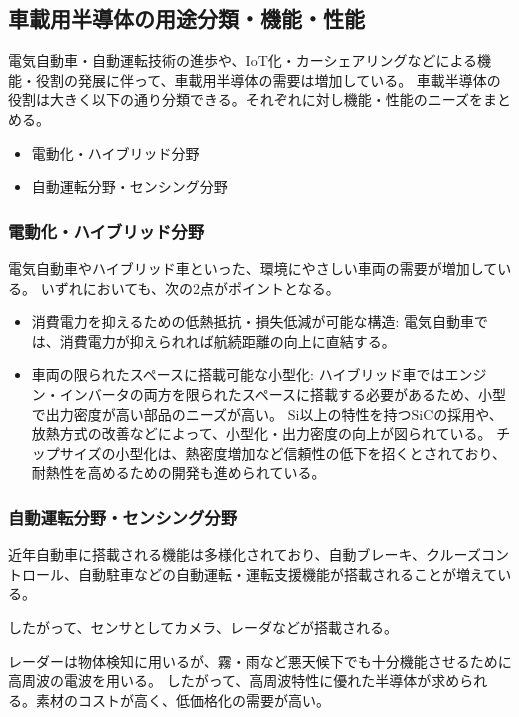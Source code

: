 \subsection{車載用半導体の用途分類・機能・性能}
電気自動車・自動運転技術の進歩や、IoT化・カーシェアリングなどによる機能・役割の発展に伴って、車載用半導体の需要は増加している。
車載半導体の役割は大きく以下の通り分類できる。\cite{ZhanZhengCheZaiBanDaoTinoDongXiangtoShiZhuangJiShunoXingFang2017}それぞれに対し機能・性能のニーズをまとめる。
\begin{itemize}
    \item 電動化・ハイブリッド分野
    \item 自動運転分野・センシング分野
\end{itemize}

\subsubsection{電動化・ハイブリッド分野}
電気自動車やハイブリッド車といった、環境にやさしい車両の需要が増加している。
いずれにおいても、次の2点がポイントとなる。
\begin{itemize}
    \item 消費電力を抑えるための低熱抵抗・損失低減が可能な構造: 
    電気自動車では、消費電力が抑えられれば航続距離の向上に直結する。\cite{ZhanZhengCheZaiBanDaoTinoDongXiangtoShiZhuangJiShunoXingFang2017}
    \item 車両の限られたスペースに搭載可能な小型化: 
    ハイブリッド車ではエンジン・インバータの両方を限られたスペースに搭載する必要があるため、小型で出力密度が高い部品のニーズが高い。
    $\mathrm{Si}$以上の特性を持つ$\mathrm{SiC}$の採用や、放熱方式の改善などによって、小型化・出力密度の向上が図られている。
    チップサイズの小型化は、熱密度増加など信頼性の低下を招くとされており、耐熱性を高めるための開発も進められている。\cite{ZhanZhengCheZaiBanDaoTinoDongXiangtoShiZhuangJiShunoXingFang2017}
\end{itemize}

\subsubsection{自動運転分野・センシング分野}
近年自動車に搭載される機能は多様化されており、自動ブレーキ、クルーズコントロール、自動駐車などの自動運転・運転支援機能が搭載されることが増えている。

したがって、センサとしてカメラ、レーダなどが搭載される。

レーダーは物体検知に用いるが、霧・雨など悪天候下でも十分機能させるために高周波の電波を用いる。
したがって、高周波特性に優れた半導体が求められる。素材のコストが高く、低価格化の需要が高い。

